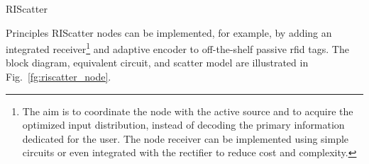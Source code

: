 \documentclass[journal]{IEEEtran}
\begin{document}
\begin{section}{RIScatter}
\begin{subsection}{Principles}
		RIScatter nodes can be implemented, for example, by adding an integrated receiver\footnote{The aim is to coordinate the node with the active source and to acquire the optimized input distribution, instead of decoding the primary information dedicated for the user. The node receiver can be implemented using simple circuits or even integrated with the rectifier \cite{Kim2021a} to reduce cost and complexity.\label{fn:integrated_receiver}} \cite{Kim2021a} and adaptive encoder \cite{He2020e} to off-the-shelf passive \gls{rfid} tags.
		The block diagram, equivalent circuit, and scatter model are illustrated in Fig.~\ref{fg:riscatter_node}.
		\begin{figure*}[!t]
			\centering
			\caption{
			Block diagram, equivalent circuit, and scatter model of a RIScatter node.
			The solid and dashed vectors represent signal and energy flows.
			The scatter antenna behaves as a constant power source, where the voltage $V_0$ and current $I_0$ are introduced by incident electric field $\vec{E}_{\text{I}}$ and magnetic field $\vec{H}_{\text{I}}$ \cite{Huang2021}.
			}
			\label{fg:riscatter_node}
		\end{figure*}
	\end{subsection}


\end{section}
\end{document}
